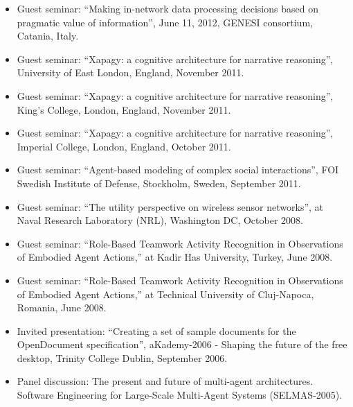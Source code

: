 \begin{itemize}[nosep, noitemsep]
    \item Guest seminar: ``Making in-network data processing decisions based on pragmatic value of information'', June 11, 2012, GENESI consortium, Catania, Italy.
    
    \item Guest seminar: ``Xapagy: a cognitive architecture for narrative reasoning'', University of East London, England, November 2011.
    
    \item Guest seminar: ``Xapagy: a cognitive architecture for narrative reasoning'', King's College, London, England, November 2011.
    
    \item Guest seminar: ``Xapagy: a cognitive architecture for narrative reasoning'', Imperial College, London, England, October 2011.
    
    \item Guest seminar: ``Agent-based modeling of complex social interactions'', FOI Swedish Institute of Defense, Stockholm, Sweden, September 2011.
    
    \item Guest seminar: ``The utility perspective on wireless sensor networks'', at Naval Research Laboratory (NRL), Washington DC, October 2008.
    
    \item Guest seminar: ``Role-Based Teamwork Activity Recognition in Observations of Embodied Agent Actions,'' at Kadir Has University, Turkey, June 2008.
    
    \item Guest seminar: ``Role-Based Teamwork Activity Recognition in Observations of Embodied Agent Actions,'' at Technical University of Cluj-Napoca, Romania, June 2008.
    
    \item Invited presentation: ``Creating a set of sample documents for the OpenDocument specification'', aKademy-2006 - Shaping the future of the free desktop, Trinity College Dublin, September 2006.
    
    \item Panel discussion: The present and future of multi-agent architectures. Software Engineering for Large-Scale Multi-Agent Systems (SELMAS-2005).
    
\end{itemize}
    